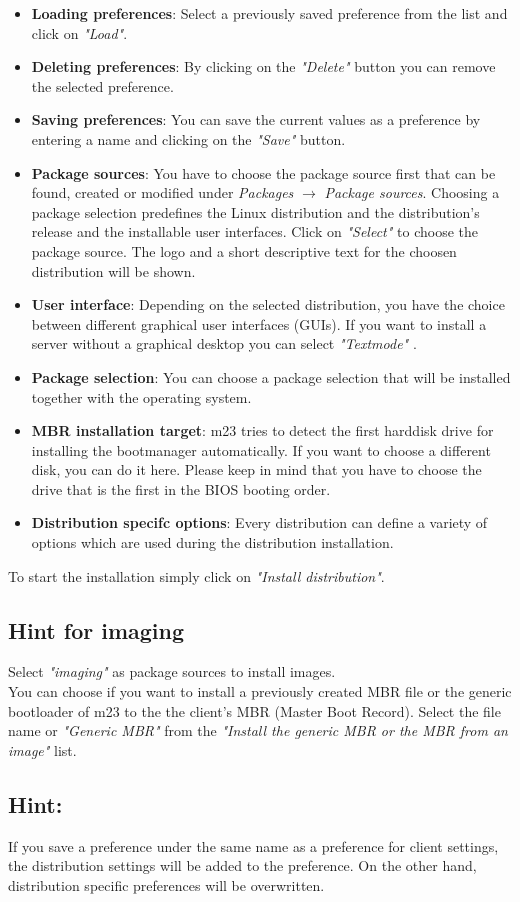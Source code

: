 \begin{itemize}
	\item \textbf{Loading preferences}: Select a previously saved preference from the list and click on \textit{"Load"}.\\
	\item \textbf{Deleting preferences}: By clicking on the \textit{"Delete"} button you can remove the selected preference.\\
	\item \textbf{Saving preferences}: You can save the current values as a preference by entering a name and clicking on the \textit{"Save"} button.\\
	\item \textbf{Package sources}: You have to choose the package source first that can be found, created or modified under  \textit{Packages} $\rightarrow$ \textit{Package sources}. Choosing a package selection predefines the Linux distribution and the distribution's release and the installable user interfaces. Click on \textit{"Select"} to choose the package source. The logo and a short descriptive text for the choosen distribution will be shown.\\
	\item \textbf{User interface}: Depending on the selected distribution, you have the choice between different graphical user interfaces (GUIs). If you want to install a server without a graphical desktop you can select \textit{"Textmode"} .\\
	\item \textbf{Package selection}: You can choose a package selection that will be installed together with the operating system.\\
	\item \textbf{MBR installation target}: m23 tries to detect the first harddisk drive for installing the bootmanager automatically. If you want to choose a different disk, you can do it here. Please keep in mind that you have to choose the drive that is the first in the BIOS booting order.\\
	\item \textbf{Distribution specifc options}: Every distribution can define a variety of options which are used during the distribution installation.\\
\end{itemize}
To start the installation simply click on \textit{"Install distribution"}.\\
\subsection{Hint for imaging}
Select \textit{"imaging"} as package sources to install images.\\
You can choose if you want to install a previously created MBR file or the generic bootloader of m23 to the the client's MBR (Master Boot Record). Select the file name or \textit{"Generic MBR"} from the \textit{"Install the generic MBR or the MBR from an image"} list.\\
\subsection{Hint:}
If you save a preference under the same name as a preference for client settings, the distribution settings will be added to the preference. On the other hand, distribution specific preferences will be overwritten.\\
